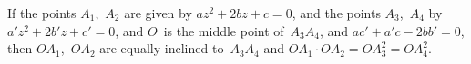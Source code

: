 If the points $A_{1}$,~$A_{2}$ are given by $az^{2} + 2bz + c = 0$, and the points
$A_{3}$,~$A_{4}$ by $a'z^{2} + 2b'z + c' = 0$, and $O$~is the middle point of~$A_{3}A_{4}$, and
$ac' + a'c - 2bb' = 0$, then $OA_{1}$,~$OA_{2}$ are equally inclined to~$A_{3}A_{4}$ and
$OA_{1} · OA_{2} = OA_{3}^{2} = OA_{4}^{2}$. 

